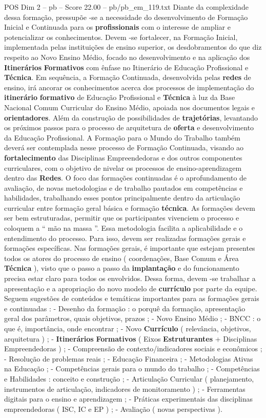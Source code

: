 \begin{textsample}{POS Dim 2 – pb – Score 22.00 – pb/pb\_em\_119.txt}
Diante da complexidade dessa formação, pressupõe -se a necessidade do desenvolvimento de Formação Inicial e Continuada para os \textbf{profissionais} com o interesse de ampliar e potencializar os conhecimentos.
Devem -se fortalecer, na Formação Inicial, implementada pelas instituições de ensino superior, os desdobramentos do que diz respeito ao Novo Ensino Médio, focado no desenvolvimento e na aplicação dos \textbf{Itinerários} \textbf{Formativos} com ênfase no Itinerário de Educação Profissional e \textbf{Técnica}.
Em sequência, a Formação Continuada, desenvolvida pelas \textbf{redes} de ensino, irá ancorar os conhecimentos acerca dos processos de implementação do \textbf{itinerário} \textbf{formativo} de Educação Profissional e \textbf{Técnica} à luz da Base Nacional Comum Curricular do Ensino Médio, apoiada nos documentos legais e \textbf{orientadores}.
Além da construção de possibilidades de \textbf{trajetórias}, levantando os próximos passos para o processo de arquitetura de \textbf{oferta} e desenvolvimento da Educação Profissional.
A Formação para o Mundo do Trabalho também deverá ser contemplada nesse processo de Formação Continuada, visando ao \textbf{fortalecimento} das Disciplinas Empreendedoras e dos outros componentes curriculares, com o objetivo de nivelar os processos de ensino-aprendizagem dentro das \textbf{Redes}.
O foco das formações continuadas é o aprofundamento de avaliação, de novas metodologias e de trabalho pautados em competências e habilidades, trabalhando esses pontos principalmente dentro da articulação curricular entre formação geral básica e formação \textbf{técnica}.
As formações devem ser bem estruturadas, permitir que os participantes vivenciem o processo e coloquem a “ mão na massa ”.
Essa metodologia facilita a aplicabilidade e o entendimento do processo.
Para isso, devem ser realizadas formações gerais e formações específicas.
Nas formações gerais, é importante que estejam presentes todos os atores do processo de ensino ( coordenações, Base Comum e Área \textbf{Técnica} ), visto que o passo a passo da \textbf{implantação} e do funcionamento precisa estar claro para todos os envolvidos.
Dessa forma, devem -se trabalhar a apresentação e a apropriação do novo modelo de \textbf{currículo} por parte da equipe.
Seguem sugestões de conteúdos e temáticas importantes para as formações gerais e continuadas : - Desenho da formação : o porquê da formação, apresentação geral dos parâmetros, quais objetivos, prazos ; - Novo Ensino Médio ; - BNCC : o que é, importância, onde encontrar ; - Novo \textbf{Currículo} ( relevância, objetivos, arquitetura ) ; - \textbf{Itinerários} \textbf{Formativos} ( Eixos \textbf{Estruturantes} + Disciplinas Empreendedoras ) ; - Compreensão de contexto/indicadores sociais e econômicos ; - Resolução de problemas reais ; - Educação Financeira ; - Metodologias Ativas na Educação ; - Competências gerais para o mundo do trabalho ; - Competências e Habilidades : conceito e construção ; - Articulação Curricular ( planejamento, instrumentos de articulação, indicadores de monitoramento ) ; - Ferramentas digitais para o ensino e aprendizagem ; - Práticas experimentais das disciplinas empreendedoras ( ISC, IC e EP ) ; - Avaliação ( novas perspectivas ).

\end{textsample}
